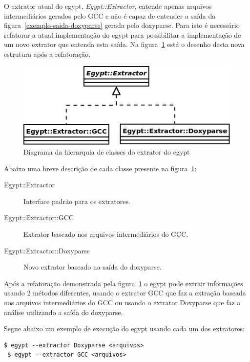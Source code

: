 O extrator atual do egypt, {\it Egypt::Extractor}, entende apenas arquivos
intermediários gerados pelo GCC e não é capaz de entender a saída da
figura~\ref{exemplo-saida-doxyparse} gerada pelo doxyparse. Para isto é
necessário refatorar a atual implementação do egypt para possibilitar a
implementação de um novo extrator que entenda esta saída. Na
figura~\ref{egypt-diagram-extractor} está o desenho desta nova estrutura após a
refatoração.

\begin{figure}[h]
\center
\includegraphics[scale=0.4]{imagens/egypt-diagram-extractor}
\caption{Diagrama da hierarquia de classes do extrator do egypt}
\label{egypt-diagram-extractor}
\end{figure}

Abaixo uma breve descrição de cada classe presente na
figura~\ref{egypt-diagram-extractor}:

\begin{description}
\item[Egypt::Extractor] Interface padrão para os extratores.
\item[Egypt::Extractor::GCC] Extrator baseado nos arquivos intermediários do GCC.
\item[Egypt::Extractor::Doxyparse] Novo extrator baseado na saída do doxyparse.
\end{description}

Após a refatoração demonstrada pela figura~\ref{egypt-diagram-extractor} o
egypt pode extrair informações usando 2 métodos diferentes, usando o extrator
GCC que faz a extração baseada nos arquivos intermediários do GCC ou usando o
extrator Doxyparse que faz a análise utilizando a saída do doxyparse.

Segue abaixo um exemplo de execução do egypt usando cada um dos extratores:

\begin{Verbatim}[frame=single,fontsize=\relsize{-2},fontfamily=courier]
 $ egypt --extractor Doxyparse <arquivos>
 $ egypt --extractor GCC <arquivos>
\end{Verbatim}

